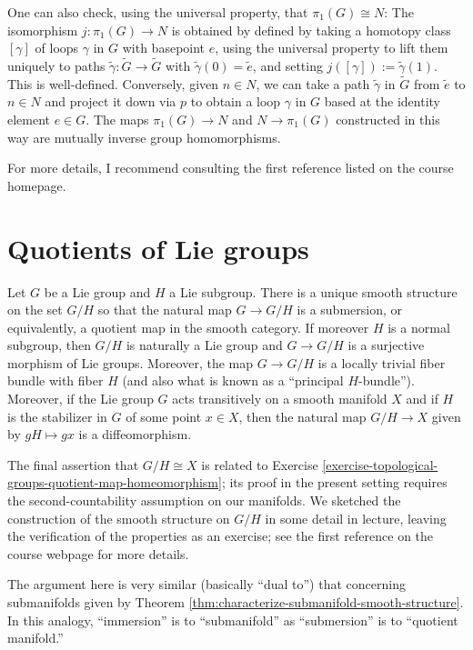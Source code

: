 \documentclass[reqno]{amsart} 
\begin{document}
One can also check, using the universal property, that $\pi_1(G) \cong N$: The isomorphism $j : \pi_1(G) \rightarrow N$ is obtained by defined by taking a homotopy class $[\gamma]$ of loops $\gamma$ in $G$ with basepoint $e$, using the universal property to lift them uniquely to paths $\tilde{\gamma} : \tilde{G} \rightarrow \tilde{G}$ with $\tilde{\gamma}(0) = \tilde{e}$, and setting $j([\gamma]) := \tilde{\gamma}(1)$.  This is well-defined.  Conversely, given $n \in N$, we can take a path $\tilde{\gamma}$ in $\tilde{G}$ from $\tilde{e}$ to $n \in N$ and project it down via $p$ to obtain a loop $\gamma$ in $G$ based at the identity element $e \in G$.  The maps $\pi_1(G) \rightarrow N$ and $N \rightarrow \pi_1(G)$ constructed in this way are mutually inverse group homomorphisms.

For more details, I recommend consulting the first reference listed on the course homepage.

\section{Quotients of Lie groups}
\label{sec:org1288635}
\begin{theorem}
  Let $G$ be a Lie group and $H$ a Lie subgroup.  There is a unique smooth structure on the set $G/H$ so that the natural map $G \rightarrow G/H$ is a submersion, or equivalently, a quotient map in the smooth category.  If moreover $H$ is a normal subgroup, then $G/H$ is naturally a Lie group and $G \rightarrow G/H$ is a surjective morphism of Lie groups.  Moreover, the map $G \rightarrow G/H$ is a locally trivial fiber bundle with fiber $H$ (and also what is known as a ``principal $H$-bundle'').  Moreover, if the Lie group $G$ acts transitively on a smooth manifold $X$ and if $H$ is the stabilizer in $G$ of some point $x \in X$, then the natural map $G/H \rightarrow X$ given by $g H \mapsto gx$ is a diffeomorphism.
\end{theorem}
The final assertion that $G/H \cong X$ is related to Exercise \ref{exercise-topological-groups-quotient-map-homeomorphism}; its proof in the present setting requires the second-countability assumption on our manifolds.  We sketched the construction of the smooth structure on $G/H$ in some detail in lecture, leaving the verification of the properties as an exercise; see the first reference on the course webpage for more details.

The argument here is very similar (basically ``dual to'') that concerning submanifolds given by Theorem \ref{thm:characterize-submanifold-smooth-structure}.  In this analogy, ``immersion'' is to ``submanifold'' as ``submersion'' is to ``quotient manifold.''
\end{document}

